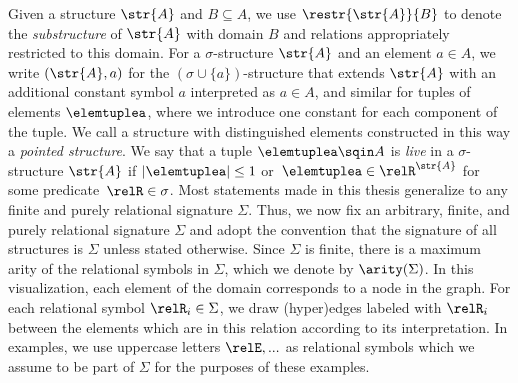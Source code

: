Given a structure $\str{A}$ and $B \subseteq A$, we use $\restr{\str{A}}{B}$ to denote the \emph{substructure} of $\str{A}$ with domain $B$ and relations appropriately restricted to this domain.
For a $\sigma$-structure $\str{A}$ and an element $a \in A$, we write $(\str{A}, a)$ for the $(\sigma \cup \{a\})$-structure that extends $\str{A}$ with an additional constant symbol $a$ interpreted as $a \in A$, and similar for tuples of elements $\elemtuplea$, where we introduce one constant for each component of the tuple.
We call a structure with distinguished elements constructed in this way a \emph{pointed structure}.
We say that a tuple $\elemtuplea \sqin A$ is \emph{live} in a $\sigma$-structure $\str{A}$ if $|\elemtuplea| \leq 1$ or~$\elemtuplea \in \relR^{\str{A}}$ for some predicate~$\relR \in \sigma$.
Most statements made in this thesis generalize to any finite and purely relational signature $\Sigma$.
Thus, we now fix an arbitrary, finite, and purely relational signature $\Sigma$ and adopt the convention that the signature of all structures is $\Sigma$ unless stated otherwise.
Since $\Sigma$ is finite, there is a maximum arity of the relational symbols in $\Sigma$, which we denote by $\arity(\Sigma)$.
In this visualization, each element of the domain corresponds to a node in the graph.
For each relational symbol $\relR_{i} \in \Sigma$, we draw (hyper)edges labeled with $\relR_{i}$ between the elements which are in this relation according to its interpretation.
In examples, we use uppercase letters $\relE, ...$ as relational symbols which we assume to be part of $\Sigma$ for the purposes of these examples.

